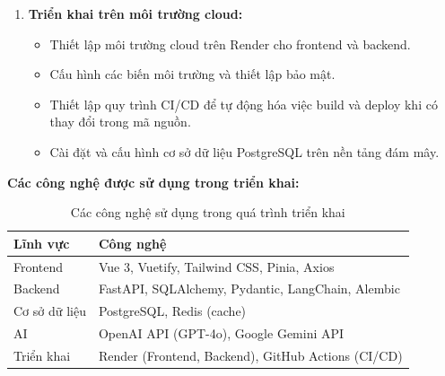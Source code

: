 \begin{enumerate}
\item \textbf{Triển khai trên môi trường cloud:}
\begin{itemize}
    \item Thiết lập môi trường cloud trên Render cho frontend và backend.
    \item Cấu hình các biến môi trường và thiết lập bảo mật.
    \item Thiết lập quy trình CI/CD để tự động hóa việc build và deploy khi có thay đổi trong mã nguồn.
    \item Cài đặt và cấu hình cơ sở dữ liệu PostgreSQL trên nền tảng đám mây.
\end{itemize}

\end{enumerate}
\textbf{Các công nghệ được sử dụng trong triển khai:}
\begin{table}[H]
\centering
\caption{Các công nghệ sử dụng trong quá trình triển khai}
\begin{tabularx}{\textwidth}{|l|X|}
\hline
\textbf{Lĩnh vực} & \textbf{Công nghệ} \\ \hline
Frontend & Vue 3, Vuetify, Tailwind CSS, Pinia, Axios \\ \hline
Backend & FastAPI, SQLAlchemy, Pydantic, LangChain, Alembic \\ \hline
Cơ sở dữ liệu & PostgreSQL, Redis (cache) \\ \hline
AI & OpenAI API (GPT-4o), Google Gemini API \\ \hline
Triển khai & Render (Frontend, Backend), GitHub Actions (CI/CD) \\ \hline
\end{tabularx}

\label{table}
\end{table}
